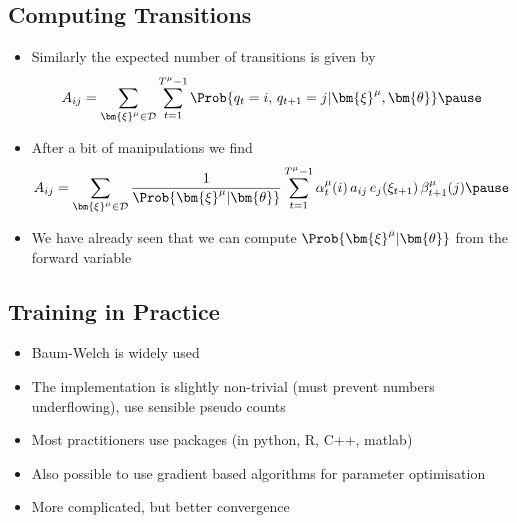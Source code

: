 
\begin{slide}
\section{Computing Transitions}
\begin{PauseHighLight}
  \begin{itemize}
  \item Similarly the expected number of transitions is given by
    \begin{align*}
      A_{ij} = \sum_{\bm{\xi}^\mu\in\mathcal{D}} \sum_{t=1}^{T^\mu-1}
      \Prob{q_t=i,\, q_{t+1}=j| \bm{\xi}^\mu, \bm{\theta}}\pause
    \end{align*}
  \item After a bit of manipulations we find
    \begin{align*}
      A_{ij} =  \sum_{\bm{\xi}^\mu\in\mathcal{D}} 
      \frac{1}{\Prob{\bm{\xi}^\mu|\bm{\theta}}}\sum_{t=1}^{T^\mu-1}
      \alpha^\mu_t(i)\, a_{ij}\, e_j(\xi_{t+1}) \, \beta^\mu_{t+1}(j)\pause
    \end{align*}
  \item We have already seen that we can compute
    $\Prob{\bm{\xi}^\mu|\bm{\theta}}$ from the forward variable\pause
  \end{itemize}
\end{PauseHighLight}

\end{slide}


\begin{slide}
\section{Training in Practice}

\begin{PauseHighLight}
  \begin{itemize}
  \item Baum-Welch is widely used\pause
  \item The implementation is slightly non-trivial (must prevent numbers
    underflowing), use sensible pseudo counts\pause
  \item Most practitioners use packages (in python, R, C++,
    matlab)\pause
  \item Also possible to use gradient based algorithms for parameter
    optimisation\pause
  \item More complicated, but better convergence\pause
  \end{itemize}
\end{PauseHighLight}

\end{slide}


